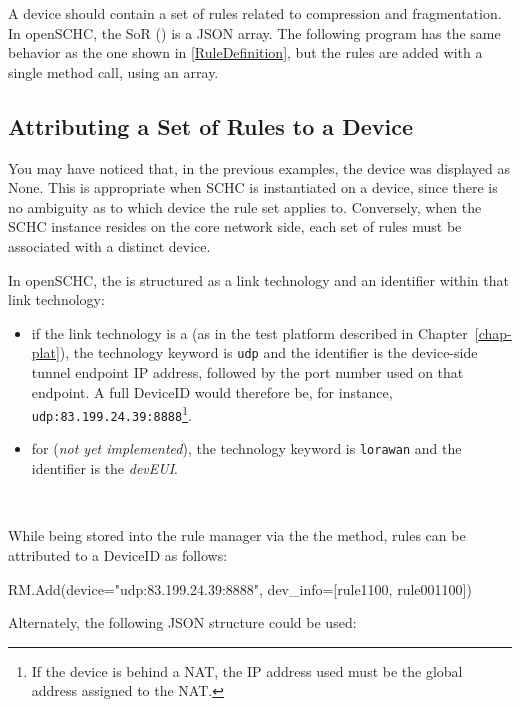 A device should contain a set of rules related to compression and fragmentation. In openSCHC, the SoR () is a JSON array. The following program has the same behavior as the one shown in \ref{RuleDefinition}, but the rules are added with a single method call, using an array.


\subsection{Attributing a Set of Rules to a Device}

You may have noticed that, in the previous examples, the device was displayed as None. This is appropriate when SCHC is instantiated on a device, since there is no ambiguity as to which device the rule set applies to. Conversely, when the SCHC instance resides on the core network side, each set of rules must be associated with a distinct device.

In openSCHC, the  is structured as a link technology and an identifier within that link technology: 
\begin{itemize}
\item if the link technology is a  (as in the test platform described in Chapter~\vref{chap-plat}), the technology keyword is \texttt{udp} and the identifier is the device-side tunnel endpoint IP address, followed by the port number used on that endpoint. A full DeviceID would therefore be, for instance, \texttt{udp:83.199.24.39:8888}\footnote{If the device is behind a NAT, the IP address used must be the global address assigned to the NAT.}. 
\item for  (\textit{not yet implemented}), the technology keyword is \texttt{lorawan} and the identifier is the \textit{devEUI}.

\end{itemize}

~~

While being stored into the rule manager via the the  method, rules can be attributed to a DeviceID as follows:

\begin{termc}[backgroundcolor=\color{palerod}, basicstyle=\ttfamily\small, escapechar=@, language=Python]
RM.Add(device="udp:83.199.24.39:8888", dev_info=[rule1100, rule001100])
\end{termc}

Alternately, the following JSON structure could be used:

